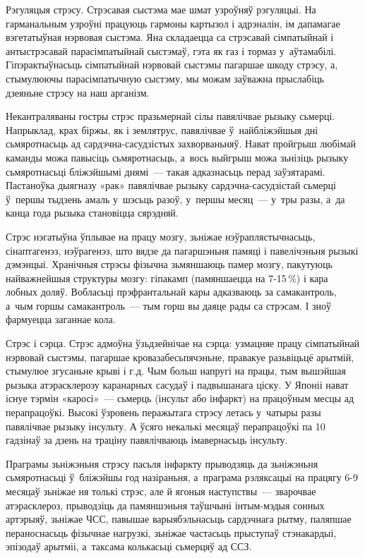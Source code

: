 Рэгуляцыя стрэсу. Стрэсавая сыстэма мае шмат узроўняў рэгуляцыі. На гарманальным узроўні працуюць гармоны картызол і адрэналін, ім дапамагае вэгетатыўная нэрвовая сыстэма. Яна складаецца са стрэсавай сімпатыйнай і антыстрэсавай парасімпатыйнай сыстэмаў, гэта як газ і тормаз у~аўтамабілі. Гіпэрактыўнасьць сімпатыйнай нэрвовай сыстэмы пагаршае шкоду стрэсу, а, стымулюючы парасімпатычную сыстэму, мы можам заўважна прыслабіць дзеяньне стрэсу на наш арганізм.

Некантраляваны гостры стрэс празьмернай сілы павялічвае рызыку сьмерці. Напрыклад, крах біржы, як і землятрус, павялічвае ў~найбліжэйшыя дні сьмяротнасьць ад сардэчна-сасудзістых захворваньняў. Нават пройгрыш любімай каманды можа павысіць сьмяротнасьць, а~вось выйгрыш можа зьнізіць рызыку сьмяротнасьці бліжэйшымі днямі~--- такая адказнасьць перад заўзятарамі. Пастаноўка дыягназу «рак» павялічвае рызыку сардэчна-сасудзістай сьмерці ў~першы тыдзень амаль у~шэсьць разоў, у~першы месяц~--- у~тры разы, а~да канца года рызыка становіцца сярэдняй.

Стрэс нэгатыўна ўплывае на працу мозгу, зьніжае нэўраплястычнасьць, сінаптагенэз, нэўрагенэз, што вядзе да пагаршэньня памяці і павелічэньня рызыкі дэмэнцыі. Хранічныя стрэсы фізычна зьмяншаюць памер мозгу, пакутуюць найважнейшыя структуры мозгу: гіпакамп (памяншаецца на 7-15\,\%) і кара лобных доляў. Вобласьці прэфрантальнай кары адказваюць за самакантроль, а~чым горшы самакантроль~--- тым горш вы даяце рады са стрэсам. І зноў фармуецца заганнае кола.

Стрэс і сэрца. Стрэс адмоўна ўзьдзейнічае на сэрца: узмацняе працу сімпатыйнай нэрвовай сыстэмы, пагаршае кровазабесьпячэньне, правакуе разьвіцьцё арытмій, стымулюе згусаньне крыві і г.д. Чым больш напругі на працы, тым вышэйшая рызыка атэрасклерозу каранарных сасудаў і падвышанага ціску. У Японіі нават існуе тэрмін «каросі»~--- сьмерць (інсульт або інфаркт) на працоўным месцы ад перапрацоўкі. Высокі ўзровень перажытага стрэсу летась у~чатыры разы павялічвае рызыку інсульту. А ўсяго некалькі месяцаў перапрацоўкі па 10 гадзінаў за дзень на траціну павялічваюць імавернасьць інсульту.

Праграмы зьніжэньня стрэсу пасьля інфаркту прыводзяць да зьніжэньня сьмяротнасьці ў~бліжэйшы год назіраньня, а~праграма рэляксацыі на працягу 6-9 месяцаў зьніжае ня толькі стрэс, але й ягоныя наступствы~--- зварочвае атэрасклероз, прыводзіць да памяншэньня таўшчыні інтым-мэдыя сонных артэрыяў, зьніжае ЧСС, павышае варыябэльнасьць сардэчнага рытму, паляпшае пераноснасьць фізычнае нагрузкі, зьніжае частасьць прыступаў стэнакардыі, эпізодаў арытміі, а~таксама колькасьці сьмерцяў ад ССЗ.

